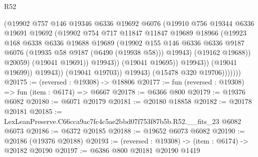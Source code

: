 \begin{lexlean}{R52}
\begin{coremodule}
                                  (@19902
                                    @757
                                    @146
                                    @19346
                                    @6336
                                    @19692
                                    @6076
                                    (@19910
                                      @756
                                      @19344
                                      @6336
                                      @19691
                                      @19692
                                      (@19902
                                        @754
                                        @717
                                        @11847
                                        @11847
                                        @19689
                                        @18966
                                        (@19923
                                          @168
                                          @6338
                                          @6336
                                          @19688
                                          @19689
                                          (@19902
                                            @155
                                            @146
                                            @6336
                                            @6336
                                            @9187
                                            @6076
                                            (@19935 @58 @9187 (@6490 (@19938 @58)))
                                            @19943)
                                          (@19162 @19688))
                                        @20059)
                                      (@19041 @19691))
                                    @19943))
                                (@19041 @19695))
                              @19943))
                          (@19041 @19699))
                        @19943))
                    (@19041 @19703))
                  @19943)
                (@15478 @320 @19706)))))))
@20175 := (reversed : @19308) -> @18806
@20177 := fun (reversed : @19308) => fun (item : @6174) => @6667
@20178 := @6366 @800
@20179 := @19376 @6082
@20180 := @6071 @20179
@20181 := @20180 @18858
@20182 := @20178 @20181
@20185 := LexLeanPreserve.C66cca9ac7fc4c5ae2bbd07f753f87b5b.R52.__fits_23 @6082 @6073
@20186 := @6372 @20185
@20188 := @19652 @6073 @6082
@20190 := @20186 (@19376 @20188)
@20193 := (reversed : @19308) -> (item : @6174) -> @20182 @20190
@20197 := @6386 @800 @20181 @20190 @1419

\end{coremodule}
\end{lexlean}
